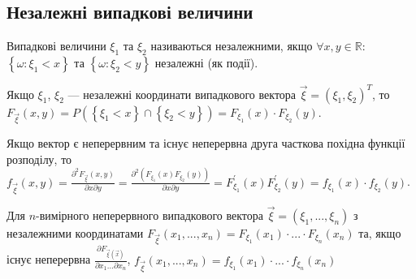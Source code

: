 \subsection{Незалежні випадкові величини}
\begin{definition}
    Випадкові величини $\xi_1$ та $\xi_2$ називаються незалежними, якщо 
    $\forall x, y \in \mathbb{R}$:  
    $\left\{\omega:\xi_1 < x\right\}$ та $\left\{\omega:\xi_2 < y\right\}$ 
    незалежні (як події).
\end{definition}
    Якщо $\xi_1$, $\xi_2$ --- незалежні координати випадкового вектора $\vec{\xi} = (\xi_1, \xi_2)^T$, 
    то $F_{\vec{\xi}}(x, y) = 
    P\left(\left\{\xi_1 < x\right\} \cap \left\{\xi_2 < y\right\}\right) = 
    F_{\xi_1}(x)\cdot F_{\xi_2}(y)$.

    Якщо вектор є неперервним та існує неперервна 
    друга часткова похідна функції розподілу, то
    $f_{\vec{\xi}}(x, y) = \frac{\partial^2 F_{\vec{\xi}}(x, y)}
    {\partial x \partial y} = \frac{\partial^2(F_{\xi_1}(x)F_{\xi_2}(y))}{\partial x \partial y} 
    = F_{\xi_1}^\prime (x)F_{\xi_2}^\prime (y) = 
    f_{\xi_1}(x)\cdot f_{\xi_2}(y)$.

    Для $n$-вимірного неперервного випадкового вектора $\vec{\xi} = \left( \xi_1, ..., \xi_n\right)$
    з незалежними координатами $F_{\vec{\xi}} (x_1, ..., x_n) = F_{\xi_1}(x_1) \cdot ... \cdot F_{\xi_n}(x_n)$ та,
    якщо існує неперервна $\frac{\partial F_{\vec{\xi}(\vec{x})}}{\partial{x_1} ... \partial{x_n}}$,
    $f_{\vec{\xi}} (x_1, ..., x_n) = f_{\xi_1}(x_1) \cdot ... \cdot f_{\xi_n}(x_n)$